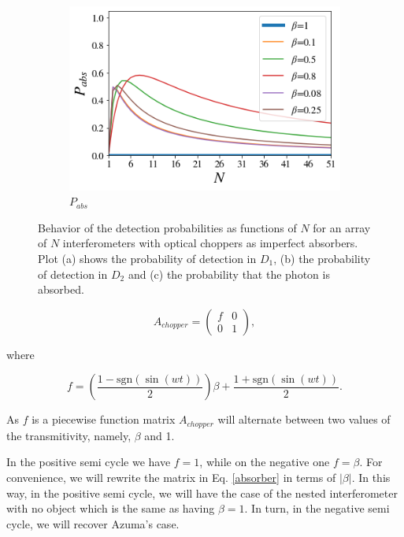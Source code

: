\documentclass[12pt]{book}
\begin{document}
\begin{figure}[!t]
\begin{subfigure}[b]{0.45\linewidth}
\includegraphics[width=\linewidth]{images/Chopper_abs.png}
\caption{$P_{abs}$}
\label{fig:BS1}
\end{subfigure}
\caption{Behavior of the detection probabilities as functions of $N$ for an array of $N$ interferometers with optical choppers as imperfect absorbers. Plot (a) shows the probability of detection in $D_{1}$, (b) the probability of detection in $D_{2}$ and (c) the probability that the photon is absorbed.}
\label{fig:several_chpper}
\end{figure}

\begin{equation}
A_{chopper}=\begin{pmatrix} f & 0 \\ 0 & 1 \end{pmatrix},
\end{equation}

where

\begin{equation}
f=\left(\frac{1-\mathrm{sgn}(\sin(wt))}{2} \right)\beta+\frac{1+\mathrm{sgn}(\sin(wt))}{2}.
\end{equation}

As $f$ is a piecewise function matrix $A_{chopper}$ will alternate between two values of the transmitivity, namely, $\beta$ and 1.



In the positive semi cycle we have $f=1$, while on the negative one $f=\beta$. For convenience, we will rewrite the matrix in Eq. \ref{absorber} in terms of $|\beta|$. In this way, in the positive semi cycle, we will have the case of the nested interferometer with no object which is the same as having $\beta=1$. In turn, in the negative semi cycle, we will recover  Azuma's case.
\end{document}
